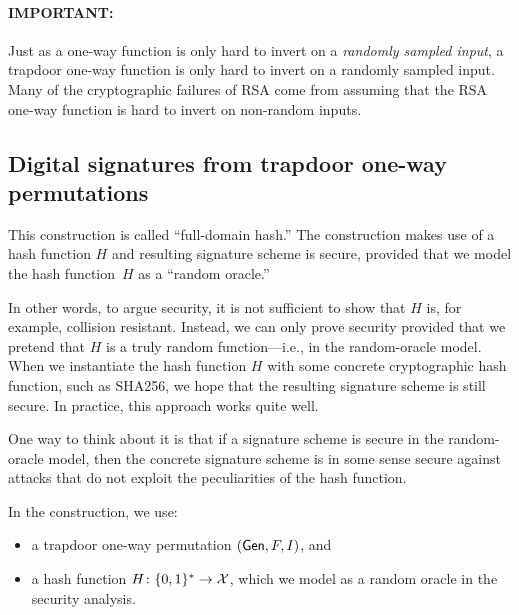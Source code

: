 \paragraph{\textbf{IMPORTANT}:}
Just as a one-way function is only hard to invert on a \emph{randomly sampled input},
a trapdoor one-way function is only hard to invert on a randomly sampled input.
Many of the cryptographic failures of RSA come from assuming that the RSA
one-way function is hard to invert on non-random inputs.


\subsection{Digital signatures from trapdoor one-way permutations}

This construction is called ``full-domain hash.''\autocite{BR93}
The construction makes use of a hash function $H$ and resulting
signature scheme is secure, provided that we model the hash function~$H$
as a ``random oracle.''

In other words, to argue security, it is not sufficient to show that
$H$ is, for example, collision resistant.
Instead, we can only prove security provided that we pretend that $H$
is a truly random function---i.e., in the random-oracle model.
When we instantiate the hash function $H$ with some concrete cryptographic
hash function, such as SHA256, we hope that the resulting signature
scheme is still secure.
In practice, this approach works quite well.

One way to think about it is that if a signature scheme is secure
in the random-oracle model, then the concrete signature scheme
is in some sense secure against attacks that do not exploit the peculiarities
of the hash function.

\medskip 

In the construction, we use:
\begin{itemize}
  \item a trapdoor one-way permutation $(\mathsf{Gen}, F, I)$, and
  \item a hash function $H \colon \{0,1\}^* \to \mathcal{X}$,
        which we model as a random oracle in the
        security analysis.
\end{itemize}

